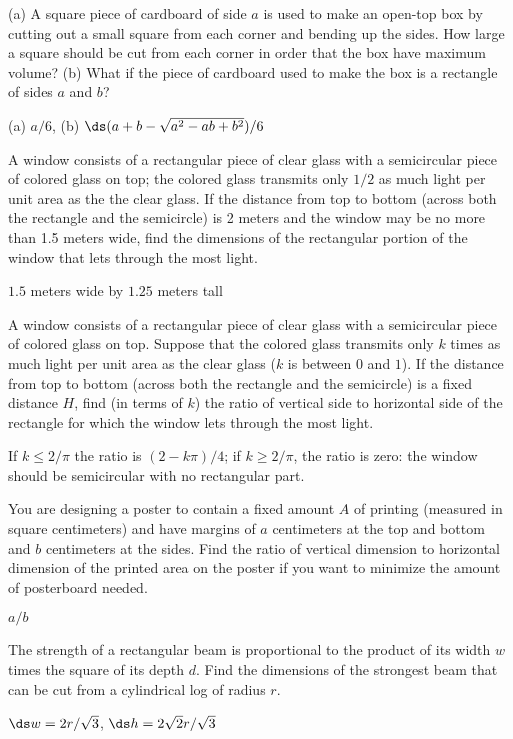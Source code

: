 \begin{exercises}
\exercise (a) A square piece of cardboard of side $a$ is used to make
an open-top box by cutting out a small square from each corner and
bending up the sides.  How large a square should be cut from each
corner in order that the box have maximum volume? (b) What if the
piece of cardboard used to make the box is a rectangle of sides $a$
and $b$?  
\begin{answer} (a) $a/6$, (b) $\ds (a+b-\sqrt{a^2-ab+b^2})/6$
\end{answer} 
\label{exercise: cardboard box}

\exercise A window consists of a rectangular piece of clear glass with
a semicircular piece of colored glass on top; the
colored glass transmits only $1/2$ as much light per unit area as the
the clear glass.  If the distance from
top to bottom (across both the rectangle and the semicircle) is
2 meters and the window may be no more than 1.5 meters wide, find the
dimensions of the rectangular portion of the window that lets through
the most light.
\begin{answer} $1.5$ meters wide by $1.25$ meters tall
\end{answer} 

\exercise A window consists of a rectangular piece of clear glass with
a semicircular piece of colored glass on top.  Suppose that the
colored glass transmits only $k$ times as much light per unit area as
the clear glass ($k$ is between $0$ and $1$).  If the distance from
top to bottom (across both the rectangle and the semicircle) is a
fixed distance $H$,
find (in terms of $k$) the ratio of vertical side to horizontal side
of the rectangle for which the window lets through the most light.
\begin{answer} If $k\le 2/\pi$ the ratio is $(2-k\pi)/4$; if $k\ge 2/\pi$,
the ratio is zero: the window should be semicircular with no
rectangular part.
\end{answer}

\exercise You are designing a poster to contain a fixed amount $A$ of
printing (measured in square centimeters) and have margins of $a$
centimeters at the top and bottom and $b$ centimeters at the sides.
Find the ratio of vertical dimension to horizontal dimension of the
printed area on the poster if you want to minimize the amount of
posterboard needed.
\begin{answer} $a/b$
\end{answer}

\exercise
The strength of a rectangular beam is proportional to the product of its
width $w$ times the square of its depth $d$.  
Find the dimensions of the strongest
beam that can be cut from a cylindrical log of radius $r$.
\begin{answer} $\ds w=2r/\sqrt3$, $\ds h=2\sqrt2r/\sqrt3$
\end{answer}


\end{exercises}
